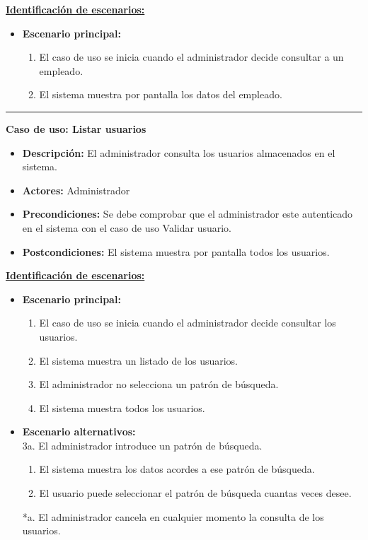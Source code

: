 \underline{\textbf{Identificación de escenarios:}}
\begin{itemize}\renewcommand{\labelitemi}{$\circ$}
 \item \textbf{Escenario principal:}
         \begin{enumerate}
          \item El caso de uso se inicia cuando el administrador decide consultar a un empleado.
	  \item El sistema muestra por pantalla los datos del empleado.
         \end{enumerate}
\end{itemize}
\smallskip
\hrule height 1pt
\smallskip
\textbf{Caso de uso: Listar usuarios}
\begin{itemize}\renewcommand{\labelitemi}{$\cdot$}
 \item \textbf{Descripción:} El administrador consulta los usuarios almacenados en el sistema.
  \item \textbf{Actores:} Administrador
  \item \textbf{Precondiciones:} Se debe comprobar que el administrador este autenticado en el sistema con el caso de uso Validar usuario.
  \item \textbf{Postcondiciones:} El sistema muestra por pantalla todos los usuarios.
\end{itemize}
\underline{\textbf{Identificación de escenarios:}}
\begin{itemize}\renewcommand{\labelitemi}{$\circ$}
 \item \textbf{Escenario principal:}
         \begin{enumerate}
          \item El caso de uso se inicia cuando el administrador decide consultar los usuarios.
          \item El sistema muestra un listado de los usuarios.
          \item El administrador no selecciona un patrón de búsqueda.
          \item El sistema muestra todos los usuarios.
         \end{enumerate}
  \item \textbf{Escenario alternativos:}\\
  			3a. El administrador introduce un patrón de búsqueda.
  			\begin{enumerate}
  			\item El sistema muestra los datos acordes a ese patrón de búsqueda.
  			\item El usuario puede seleccionar el patrón de búsqueda cuantas veces desee.
  			\end{enumerate}
          *a. El administrador cancela en cualquier momento la consulta de los usuarios.
\end{itemize}

